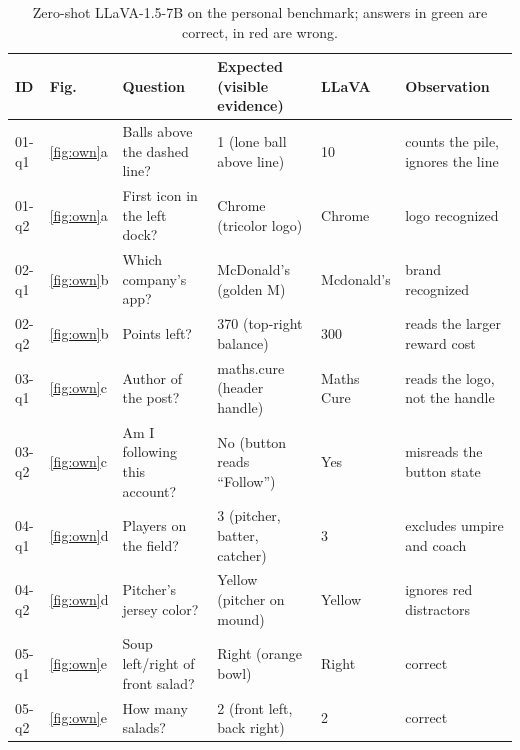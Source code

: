 \documentclass[10pt,twocolumn,letterpaper]{article}
\newcommand{\good}[1]{\textcolor{okgreen}{#1}}
\newcommand{\bad}[1]{\textcolor{badred}{#1}}
\begin{document}
\begin{table}[t]
  \centering
  \footnotesize
  \setlength{\tabcolsep}{4pt}
  \begin{tabular}{llllll}
    \toprule
    ID & Fig. & Question & Expected (visible evidence) & LLaVA & Observation \\
    \midrule
    01-q1 & \ref{fig:own}a & Balls above the dashed line?    & 1 (lone ball above line)        & \bad{10}          & counts the pile, ignores the line \\
    01-q2 & \ref{fig:own}a & First icon in the left dock?    & Chrome (tricolor logo)          & \good{Chrome}     & logo recognized \\
    02-q1 & \ref{fig:own}b & Which company's app?            & McDonald's (golden M)           & \good{Mcdonald's} & brand recognized \\
    02-q2 & \ref{fig:own}b & Points left?                    & 370 (top-right balance)         & \bad{300}         & reads the larger reward cost \\
    03-q1 & \ref{fig:own}c & Author of the post?             & maths.cure (header handle)      & \bad{Maths Cure}  & reads the logo, not the handle \\
    03-q2 & \ref{fig:own}c & Am I following this account?    & No (button reads ``Follow'')    & \bad{Yes}         & misreads the button state \\
    04-q1 & \ref{fig:own}d & Players on the field?           & 3 (pitcher, batter, catcher)    & \good{3}          & excludes umpire and coach \\
    04-q2 & \ref{fig:own}d & Pitcher's jersey color?         & Yellow (pitcher on mound)       & \good{Yellow}     & ignores red distractors \\
    05-q1 & \ref{fig:own}e & Soup left/right of front salad? & Right (orange bowl)             & \good{Right}      & correct \\
    05-q2 & \ref{fig:own}e & How many salads?                & 2 (front left, back right)      & \good{2}          & correct \\
    \bottomrule
  \end{tabular}
  \caption{Zero-shot LLaVA-1.5-7B on the personal benchmark; answers in \good{green} are correct, in \bad{red} are wrong.}
  \label{tab:own}
\end{table}
\end{document}
